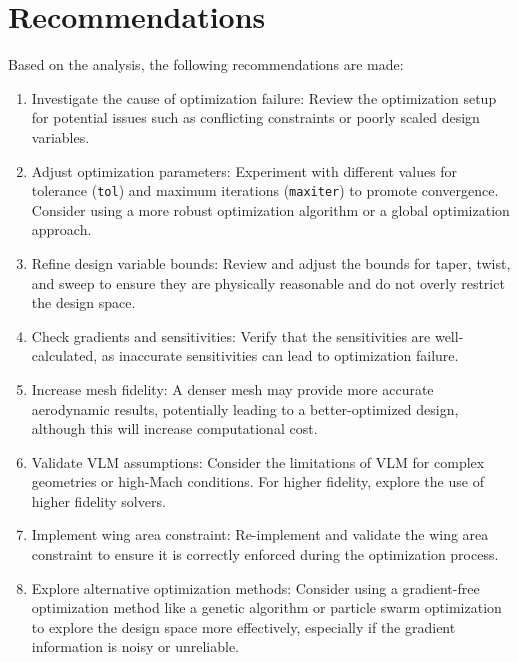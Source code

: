\documentclass{article}
\begin{document}
\section{Recommendations}
Based on the analysis, the following recommendations are made:
\begin{enumerate}
    \item Investigate the cause of optimization failure: Review the optimization setup for potential issues such as conflicting constraints or poorly scaled design variables.
    \item Adjust optimization parameters: Experiment with different values for tolerance (\texttt{tol}) and maximum iterations (\texttt{maxiter}) to promote convergence. Consider using a more robust optimization algorithm or a global optimization approach.
    \item Refine design variable bounds: Review and adjust the bounds for taper, twist, and sweep to ensure they are physically reasonable and do not overly restrict the design space.
    \item Check gradients and sensitivities: Verify that the sensitivities are well-calculated, as inaccurate sensitivities can lead to optimization failure.
    \item Increase mesh fidelity: A denser mesh may provide more accurate aerodynamic results, potentially leading to a better-optimized design, although this will increase computational cost.
    \item Validate VLM assumptions: Consider the limitations of VLM for complex geometries or high-Mach conditions. For higher fidelity, explore the use of higher fidelity solvers.
    \item Implement wing area constraint: Re-implement and validate the wing area constraint to ensure it is correctly enforced during the optimization process.
    \item Explore alternative optimization methods:  Consider using a gradient-free optimization method like a genetic algorithm or particle swarm optimization to explore the design space more effectively, especially if the gradient information is noisy or unreliable.
\end{enumerate}
\end{document}

